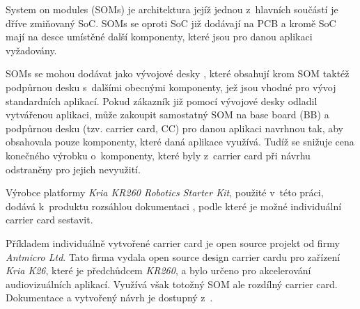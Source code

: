 \documentclass[a4paper, twoside, 11pt]{article}
\begin{document}
	System on modules (SOMs) je architektura jejíž jednou z~hlavních součástí je dříve zmiňovaný SoC. SOMs se oproti SoC již dodávají na PCB a kromě SoC mají na desce umístěné další komponenty, které jsou pro danou aplikaci vyžadovány. \cite{xilinx-what-is-a-som}\par
	SOMs se mohou dodávat jako vývojové desky \cite{xilinx-kria-kr260-robotics-starter-kit}, které obsahují krom SOM taktéž podpůrnou desku s~dalšími obecnými komponenty, jež jsou vhodné pro vývoj standardních aplikací. Pokud zákazník již pomocí vývojové desky odladil vytvářenou aplikaci, může zakoupit samostatný SOM na base board (BB) a podpůrnou desku (tzv. carrier card, CC) pro danou aplikaci navrhnou tak, aby obsahovala pouze komponenty, které daná aplikace využívá. Tudíž se snižuje cena konečného výrobku o~komponenty, které byly z~carrier card při návrhu odstraněny pro jejich nevyužití.\par
	Výrobce platformy \textit{Kria KR260 Robotics Starter Kit}, použité v~této práci, dodává k~produktu rozsáhlou dokumentaci \cite{kria-som-carrier-card-design-guide-2022} \cite{kria-k26-som-ds}, podle které je možné individuální carrier card sestavit. \par
	Příkladem individuálně vytvořené carrier card je open source projekt od firmy \textit{Antmicro Ltd}. Tato firma vydala open source design carrier cardu pro zařízení \textit{Kria K26}, které je předchůdcem \textit{KR260}, a bylo určeno pro akcelerování audiovizuálních aplikací. Využívá však totožný SOM ale rozdílný carrier card. Dokumentace a vytvořený návrh je dostupný z~\cite{antmicro-open-source-kria-k26-carrier-card}.
\end{document}
